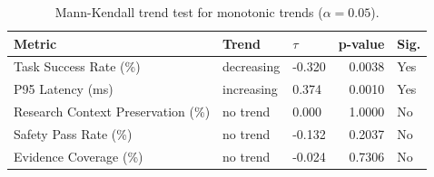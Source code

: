 \begin{table}[htbp]
\renewcommand{\arraystretch}{1.2}
\centering
\small
\setlength{\tabcolsep}{3pt}
\caption{Mann-Kendall trend test for monotonic trends ($\alpha=0.05$).}
\label{tab:mann_kendall}
\begin{tabular}{p{1.75cm}llrl}
\toprule
\textbf{Metric} & \textbf{Trend} & \textbf{$\tau$} & \textbf{p-value} & \textbf{Sig.} \\
\midrule
Task Success Rate (\%) & decreasing & -0.320 & 0.0038 & Yes \\
P95 Latency (ms) & increasing & 0.374 & 0.0010 & Yes \\
Research Context Preservation (\%) & no trend & 0.000 & 1.0000 & No \\
Safety Pass Rate (\%) & no trend & -0.132 & 0.2037 & No \\
Evidence Coverage (\%) & no trend & -0.024 & 0.7306 & No \\
\bottomrule
\end{tabular}
\setlength{\tabcolsep}{6pt}
\end{table}
